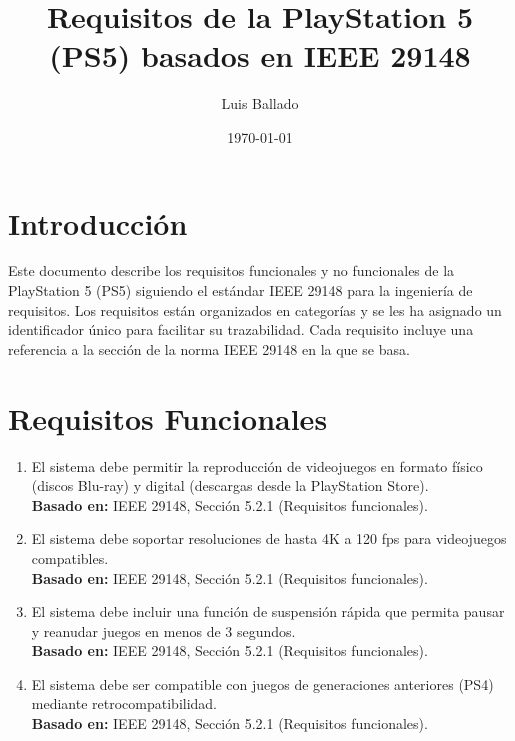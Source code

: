 \documentclass{article}
\title{Requisitos de la PlayStation 5 (PS5) basados en IEEE 29148}
\author{Luis Ballado}
\date{\today}
\begin{document}
\maketitle

\section*{Introducción}
Este documento describe los requisitos funcionales y no funcionales de la PlayStation 5 (PS5) siguiendo el estándar IEEE 29148 para la ingeniería de requisitos. Los requisitos están organizados en categorías y se les ha asignado un identificador único para facilitar su trazabilidad. Cada requisito incluye una referencia a la sección de la norma IEEE 29148 en la que se basa.

\section{Requisitos Funcionales}
\begin{enumerate}[label=RF-\arabic*]
    \item El sistema debe permitir la reproducción de videojuegos en formato físico (discos Blu-ray) y digital (descargas desde la PlayStation Store). \\
    \textbf{Basado en:} IEEE 29148, Sección 5.2.1 (Requisitos funcionales).
    
    \item El sistema debe soportar resoluciones de hasta 4K a 120 fps para videojuegos compatibles. \\
    \textbf{Basado en:} IEEE 29148, Sección 5.2.1 (Requisitos funcionales).
    
    \item El sistema debe incluir una función de suspensión rápida que permita pausar y reanudar juegos en menos de 3 segundos. \\
    \textbf{Basado en:} IEEE 29148, Sección 5.2.1 (Requisitos funcionales).
    
    \item El sistema debe ser compatible con juegos de generaciones anteriores (PS4) mediante retrocompatibilidad. \\
    \textbf{Basado en:} IEEE 29148, Sección 5.2.1 (Requisitos funcionales).
\end{enumerate}
\end{document}
